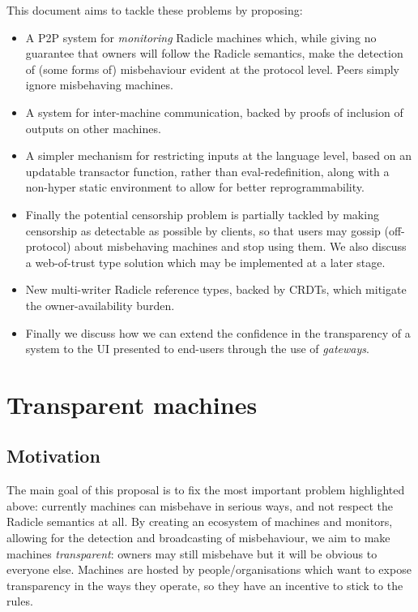 \documentclass[a4paper, oneside, 10pt]{amsart}
\begin{document}
This document aims to tackle these problems by proposing:
\begin{itemize}
  \item A P2P system for \emph{monitoring} Radicle machines which, while giving
    no guarantee that owners will follow the Radicle semantics, make the
    detection of (some forms of) misbehaviour evident at the protocol
    level. Peers simply ignore misbehaving machines.
  \item A system for inter-machine communication, backed by proofs of inclusion
    of outputs on other machines.
  \item A simpler mechanism for restricting inputs at the language level, based
    on an updatable transactor function, rather than eval-redefinition, along
    with a non-hyper static environment to allow for better reprogrammability.
  \item Finally the potential censorship problem is partially tackled by making
    censorship as detectable as possible by clients, so that users may gossip
    (off-protocol) about misbehaving machines and stop using them. We also
    discuss a web-of-trust type solution which may be implemented at a later
    stage.
  \item
    New multi-writer Radicle reference types, backed by CRDTs, which mitigate
    the owner-availability burden.
  \item
    Finally we discuss how we can extend the confidence in the transparency of a
    system to the UI presented to end-users through the use of \emph{gateways}.
\end{itemize}

\section{Transparent machines}\label{transparent-machines}

\subsection{Motivation}

The main goal of this proposal is to fix the most important problem highlighted
above: currently machines can misbehave in serious ways, and not respect the
Radicle semantics at all. By creating an ecosystem of machines and monitors,
allowing for the detection and broadcasting of misbehaviour, we aim to make
machines \emph{transparent}: owners may still misbehave but it will be obvious
to everyone else. Machines are hosted by people/organisations which want to
expose transparency in the ways they operate, so they have an incentive to stick
to the rules.
\end{document}
